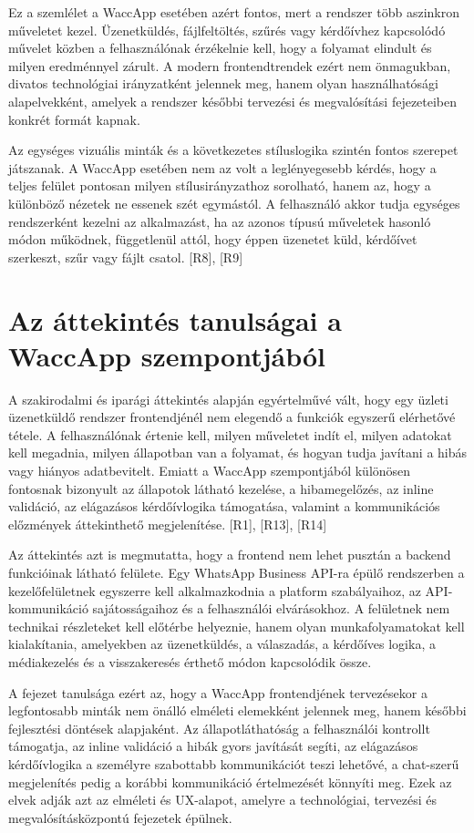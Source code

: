 Ez a szemlélet a WaccApp esetében azért fontos, mert a rendszer több aszinkron műveletet kezel. Üzenetküldés, fájlfeltöltés, szűrés vagy kérdőívhez kapcsolódó művelet közben a felhasználónak érzékelnie kell, hogy a folyamat elindult és milyen eredménnyel zárult. A modern frontendtrendek ezért nem önmagukban, divatos technológiai irányzatként jelennek meg, hanem olyan használhatósági alapelvekként, amelyek a rendszer későbbi tervezési és megvalósítási fejezeteiben konkrét formát kapnak.

Az egységes vizuális minták és a következetes stíluslogika szintén fontos szerepet játszanak. A WaccApp esetében nem az volt a leglényegesebb kérdés, hogy a teljes felület pontosan milyen stílusirányzathoz sorolható, hanem az, hogy a különböző nézetek ne essenek szét egymástól. A felhasználó akkor tudja egységes rendszerként kezelni az alkalmazást, ha az azonos típusú műveletek hasonló módon működnek, függetlenül attól, hogy éppen üzenetet küld, kérdőívet szerkeszt, szűr vagy fájlt csatol. [R8], [R9]

\section{Az áttekintés tanulságai a WaccApp szempontjából}

A szakirodalmi és iparági áttekintés alapján egyértelművé vált, hogy egy üzleti üzenetküldő rendszer frontendjénél nem elegendő a funkciók egyszerű elérhetővé tétele. A felhasználónak értenie kell, milyen műveletet indít el, milyen adatokat kell megadnia, milyen állapotban van a folyamat, és hogyan tudja javítani a hibás vagy hiányos adatbevitelt. Emiatt a WaccApp szempontjából különösen fontosnak bizonyult az állapotok látható kezelése, a hibamegelőzés, az inline validáció, az elágazásos kérdőívlogika támogatása, valamint a kommunikációs előzmények áttekinthető megjelenítése. [R1], [R13], [R14]

Az áttekintés azt is megmutatta, hogy a frontend nem lehet pusztán a backend funkcióinak látható felülete. Egy WhatsApp Business API-ra épülő rendszerben a kezelőfelületnek egyszerre kell alkalmazkodnia a platform szabályaihoz, az API-kommunikáció sajátosságaihoz és a felhasználói elvárásokhoz. A felületnek nem technikai részleteket kell előtérbe helyeznie, hanem olyan munkafolyamatokat kell kialakítania, amelyekben az üzenetküldés, a válaszadás, a kérdőíves logika, a médiakezelés és a visszakeresés érthető módon kapcsolódik össze.

A fejezet tanulsága ezért az, hogy a WaccApp frontendjének tervezésekor a legfontosabb minták nem önálló elméleti elemekként jelennek meg, hanem későbbi fejlesztési döntések alapjaként. Az állapotláthatóság a felhasználói kontrollt támogatja, az inline validáció a hibák gyors javítását segíti, az elágazásos kérdőívlogika a személyre szabottabb kommunikációt teszi lehetővé, a chat-szerű megjelenítés pedig a korábbi kommunikáció értelmezését könnyíti meg. Ezek az elvek adják azt az elméleti és UX-alapot, amelyre a technológiai, tervezési és megvalósításközpontú fejezetek épülnek.
